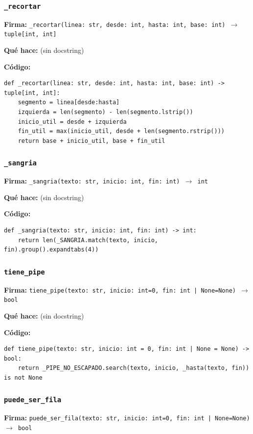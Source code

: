 \documentclass[11pt,a4paper]{article}
\begin{document}
\subsubsection*{\texttt{\_recortar}}
\textbf{Firma:} \texttt{\_recortar(linea: str, desde: int, hasta: int, base: int) $\rightarrow$ tuple[int, int]}

\textbf{Qué hace:} (sin docstring)

\textbf{Código:}
\begin{lstlisting}
def _recortar(linea: str, desde: int, hasta: int, base: int) -> tuple[int, int]:
    segmento = linea[desde:hasta]
    izquierda = len(segmento) - len(segmento.lstrip())
    inicio_util = desde + izquierda
    fin_util = max(inicio_util, desde + len(segmento.rstrip()))
    return base + inicio_util, base + fin_util
\end{lstlisting}

\subsubsection*{\texttt{\_sangria}}
\textbf{Firma:} \texttt{\_sangria(texto: str, inicio: int, fin: int) $\rightarrow$ int}

\textbf{Qué hace:} (sin docstring)

\textbf{Código:}
\begin{lstlisting}
def _sangria(texto: str, inicio: int, fin: int) -> int:
    return len(_SANGRIA.match(texto, inicio, fin).group().expandtabs(4))
\end{lstlisting}

\subsubsection*{\texttt{tiene\_pipe}}
\textbf{Firma:} \texttt{tiene\_pipe(texto: str, inicio: int=0, fin: int | None=None) $\rightarrow$ bool}

\textbf{Qué hace:} (sin docstring)

\textbf{Código:}
\begin{lstlisting}
def tiene_pipe(texto: str, inicio: int = 0, fin: int | None = None) -> bool:
    return _PIPE_NO_ESCAPADO.search(texto, inicio, _hasta(texto, fin)) is not None
\end{lstlisting}

\subsubsection*{\texttt{puede\_ser\_fila}}
\textbf{Firma:} \texttt{puede\_ser\_fila(texto: str, inicio: int=0, fin: int | None=None) $\rightarrow$ bool}
\end{document}
